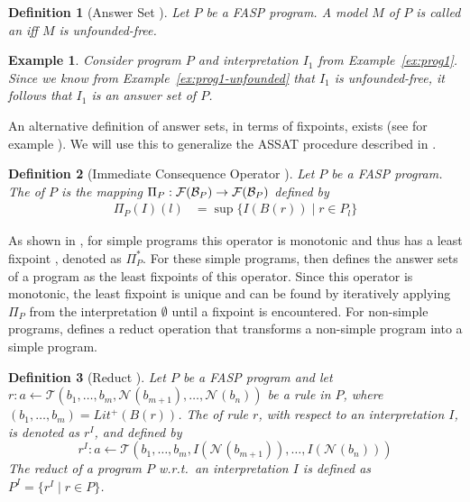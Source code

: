 \documentclass{tlp}
\newcommand{\hbase}[1]{{\ensuremath{{\cal B}_{#1}}}}
\newcommand{\body}[1]{\ensuremath{B(#1)}}
\newcommand{\poslit}[1]{\ensuremath{Lit^{+}(#1)}}
\newcommand{\posbody}[1]{\ensuremath{\poslit{\body{#1}}}}
\newcommand{\Fuzzy}[1]{\ensuremath{\mathcal{F}({#1})}}
\newcommand{\fneg}[2]{\ensuremath{\mathcal{N}_{#1}(#2)}}
\newcommand{\pretnorm}{\mathcal{T}}
\newcommand{\nfimcons}[1]{\Pi_{#1}}
\newcommand{\lfpnfimcons}[1]{\nfimcons{#1}^{*}}
\newtheorem{definition}{Definition}
\newtheorem{example}{Example}
\begin{document}
\begin{definition}[Answer Set \cite{FASP:amai}]\label{def:kanswersets}
 Let $P$ be a FASP program. A model $M$ of $P$ is called an  iff $M$ is unfounded-free.
\end{definition}

\begin{example}
Consider program $P$ and interpretation $I_1$ from Example~\ref{ex:prog1}. Since we know from Example~\ref{ex:prog1-unfounded} that $I_{1}$ is unfounded-free, it follows that $I_{1}$ is an answer set of $P$.
\end{example}

An alternative definition of answer sets, in terms of fixpoints, exists (see for example \cite{Luka06}). We will use this to generalize the ASSAT procedure described in \cite{assat-linzhao}. 

\begin{definition}[Immediate Consequence Operator \cite{Luka06}]\label{def:imcons}
 Let $P$ be a FASP program. The  of $P$ is the mapping $\nfimcons{P} : \Fuzzy{\hbase{P}} \to \Fuzzy{\hbase{P}}$ defined by
  \begin{align*}
   \nfimcons{P}(I)(l) &= \sup \{ I(\body{r}) \mid r \in P_l \}
  \end{align*}
\end{definition}

As shown in \cite{Luka06}, for simple programs this operator is monotonic and thus has a least fixpoint \cite{tarski:lattice}, denoted as $\lfpnfimcons{P}$. For these simple programs, \cite{Luka06} then defines the answer sets of a program as the least fixpoints of this operator. Since this operator is monotonic, the least fixpoint is unique and can be found by iteratively applying $\nfimcons{P}$ from the interpretation $\emptyset$ until a fixpoint is encountered. For non-simple programs, \cite{Luka06} defines a reduct operation that transforms a non-simple program into a simple program.

\begin{definition}[Reduct \cite{Luka06}]\label{def:reduct}
 Let $P$ be a FASP program and let $r: a \gets \pretnorm(b_1,\ldots,b_m,\fneg{}{b_{m+1}},\ldots,\fneg{}{b_{n}})$ be a rule in $P$, where $(b_1,\ldots,b_m) = \posbody{r}$. The  of rule $r$, with respect to an interpretation $I$, is denoted as $r^I$, and defined by
   $$r^I: a \gets \pretnorm(b_1,\ldots,b_m,I(\fneg{}{b_{m+1}}),\ldots,I(\fneg{}{b_n}))$$
 The reduct of a program $P$ w.r.t.~an interpretation $I$ is defined as $P^I = \{ r^I \mid r \in P \}$.
\end{definition}
\end{document}
